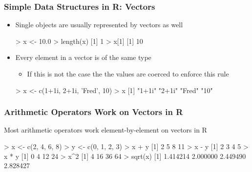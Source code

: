 \documentclass{beamer}
\begin{document}
\begin{frame}[fragile]
  \frametitle{Simple Data Structures in R: Vectors}

\begin{itemize}

\item Single objects are usually represented by vectors as well
\begin{Rcode}
> x <- 10.0
> length(x)
[1] 1
> x[1]
[1] 10
\end{Rcode}


\item Every element in a vector is of the same type

\begin{itemize}
	\item If this is not the case the the values are coerced to enforce this rule
\end{itemize}

\begin{Rcode}
> x <- c(1+1i, 2+1i, 'Fred', 10)
> x
[1] "1+1i" "2+1i" "Fred" "10"
\end{Rcode}

\end{itemize}

\end{frame}


\begin{frame}[fragile]
  \frametitle{Arithmetic Operators Work on Vectors in R}

Most arithmetic operators work element-by-element on vectors in R

\begin{Rcode}
> x <- c(2, 4, 6, 8)
> y <- c(0, 1, 2, 3)
> x + y
[1]  2  5  8 11
> x - y
[1] 2 3 4 5
> x * y
[1]  0  4 12 24
> x^2
[1]  4 16 36 64
> sqrt(x)
[1] 1.414214 2.000000 2.449490 2.828427
\end{Rcode}

\end{frame}
\end{document}
